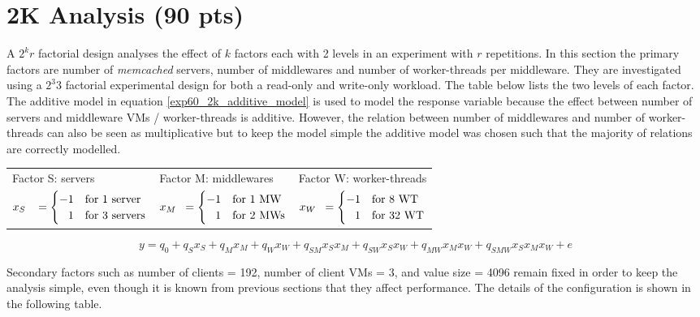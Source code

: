 \documentclass[report.tex]{subfiles}
\begin{document}
\section{2K Analysis (90 pts)}


A $2^{k}r$ factorial design analyses the effect of $k$ factors each with 2 levels in an experiment with $r$ repetitions. In this section the primary factors are number of \emph{memcached} servers, number of middlewares and number of worker-threads per middleware.
They are investigated using a $2^{3}3$ factorial experimental design for both a read-only and write-only workload. The table below lists the two levels of each factor.
The additive model in equation \ref{exp60_2k_additive_model} is used to model the response variable because the effect between number of servers and middleware VMs / worker-threads is additive. However, the relation between number of middlewares and  number of worker-threads can also be seen as multiplicative but to keep the model simple the additive model was chosen such that the majority of relations are correctly modelled.


\begin{center}
	\begin{tabular}{l|l|l}
		Factor S: servers & Factor M:  middlewares & Factor W: worker-threads\Tstrut \\
		$x_{S\hphantom{M}} = \begin{cases}-1 & \text{for 1 server}\\ \hphantom{-}1 & \text{for 3 servers}\end{cases}$ &
		$x_{M\hphantom{S}} = \begin{cases}-1 & \text{for 1 MW}\\ \hphantom{-}1 & \text{for 2 MWs}\end{cases}$ & 
		$x_{W\hphantom{S}} = \begin{cases}-1 & \text{for 8 WT}\\ \hphantom{-}1 & \text{for 32 WT}\end{cases}$\Bstrut\\
	\end{tabular} 
\end{center}

\begin{equation}
y=q_0 + q_Sx_S + q_Mx_M + q_Wx_W + q_{SM}x_Sx_M + q_{SW}x_Sx_W + q_{MW}x_Mx_W + q_{SMW}x_Sx_Mx_W + e
\label{exp60_2k_additive_model}
\end{equation}

Secondary factors such as number of clients = 192, number of client VMs = 3, and value size = 4096 remain fixed in order to keep the analysis simple, even though it is known from previous sections that they affect performance.
The details of the configuration is shown in the following table.
\end{document}
